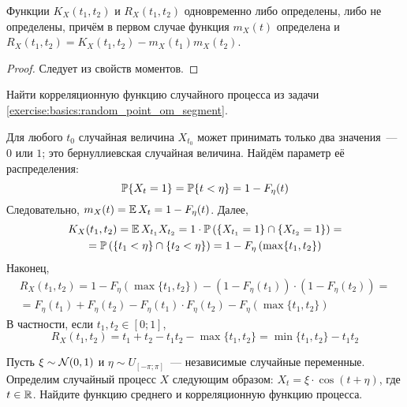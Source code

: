 \begin{statement}
    \label{statement:basics:correlation_and_covariation_connection}
    Функции $ K_X(t_1, t_2) $ и $ R_X(t_1, t_2) $ одновременно либо определены, либо не определены,
    причём в первом случае функция $ m_X(t) $ определена и $ R_X(t_1, t_2) = K_X(t_1, t_2) - m_X(t_1) m_X(t_2) $.
\end{statement}

\begin{proof}
    Следует из свойств моментов.
\end{proof}

\begin{Exercise}[counter=SecExercise, label={exercise:basics:random_point_om_segment_moments}]
    \noindent
    Найти корреляционную функцию случайного процесса из задачи \ref{exercise:basics:random_point_om_segment}.
\end{Exercise}

\begin{Answer}
    \noindent
    Для любого $ t_0 $ случайная величина $ X_{t_0} $ может принимать только два значения~--- $ 0 $ или $ 1 $;
    это бернуллиевская случайная величина.
    Найдём параметр её распределения:
    \[
        \mathbb{P} \{X_t = 1\} = \mathbb{P} \{t < \eta\} = 1 - F_\eta(t)
    \]
    Следовательно, $ m_X(t) = \operatorname{\mathbb{E}} X_t = 1 - F_\eta(t) $.
    Далее,
    \begin{multline*}
        K_X(t_1, t_2) = \operatorname{\mathbb{E}} X_{t_1} X_{t_2} = 1 \cdot \mathbb{P} \left( \{X_{t_1} = 1\} \cap \{X_{t_2} = 1\} \right) = \\
        = \mathbb{P} \left( \{t_1 < \eta\} \cap \{t_2 < \eta\} \right) = 1 - F_\eta\left( \max \{t_1, t_2\} \right)
    \end{multline*}
    Наконец,
    \begin{multline*}
        R_X(t_1, t_2) = 1 - F_\eta\left( \max \{t_1, t_2\} \right) - (1 - F_\eta(t_1)) \cdot (1 - F_\eta(t_2)) = \\
        = F_\eta(t_1) + F_\eta(t_2) - F_\eta(t_1) \cdot F_\eta(t_2) - F_\eta(\max\{t_1, t_2\})
    \end{multline*}
    В частности, если $ t_1, t_2 \in [0; 1] $,
    \[
        R_X(t_1, t_2) = t_1 + t_2 - t_1 t_2 - \max\{t_1, t_2\} = \min\{t_1, t_2\} - t_1 t_2
    \]
\end{Answer}

\begin{Exercise}[counter=SecExercise, label={exercise:basics:cosine_stochastic_process}]
    \noindent
    Пусть $ \xi \sim \mathcal{N}(0, 1) $ и $ \eta \sim U_{[-\pi; \pi]} $~--- независимые случайные переменные.
    Определим случайный процесс $ X $ следующим образом: $ X_t = \xi \cdot \cos(t + \eta) $, где $ t \in \mathbb{R} $.
    Найдите функцию среднего и корреляционную функцию процесса.
\end{Exercise}

